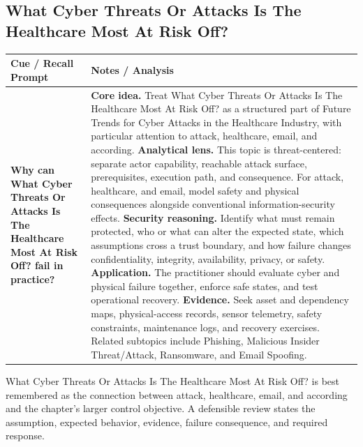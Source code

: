 \documentclass[11pt]{article}
\newcommand{\CornellHeader}{%
\rowcolor{Navy}\color{white}\bfseries Cue / Recall Prompt & \color{white}\bfseries Notes / Analysis\\\hline}
\newcommand{\CornellRow}[2]{%
\cellcolor{CueGray}\RaggedRight\textbf{#1} & \RaggedRight #2\\\hline}
\begin{document}
\subsection*{What Cyber Threats Or Attacks Is The Healthcare Most At Risk Off?}
\begin{longtable}{>{\RaggedRight\arraybackslash}p{}|>{\RaggedRight\arraybackslash}p{}}
\CornellHeader
\CornellRow{Why can What Cyber Threats Or Attacks Is The Healthcare Most At Risk Off? fail in practice?}{\textbf{Core idea.} Treat What Cyber Threats Or Attacks Is The Healthcare Most At Risk Off? as a structured part of Future Trends for Cyber Attacks in the Healthcare Industry, with particular attention to attack, healthcare, email, and according. \textbf{Analytical lens.} This topic is threat-centered: separate actor capability, reachable attack surface, prerequisites, execution path, and consequence. For attack, healthcare, and email, model safety and physical consequences alongside conventional information-security effects. \textbf{Security reasoning.} Identify what must remain protected, who or what can alter the expected state, which assumptions cross a trust boundary, and how failure changes confidentiality, integrity, availability, privacy, or safety. \textbf{Application.} The practitioner should evaluate cyber and physical failure together, enforce safe states, and test operational recovery. \textbf{Evidence.} Seek asset and dependency maps, physical-access records, sensor telemetry, safety constraints, maintenance logs, and recovery exercises. Related subtopics include Phishing, Malicious Insider Threat/Attack, Ransomware, and Email Spoofing.}
\end{longtable}
\begin{topicsummary}
What Cyber Threats Or Attacks Is The Healthcare Most At Risk Off? is best remembered as the connection between attack, healthcare, email, and according and the chapter's larger control objective. A defensible review states the assumption, expected behavior, evidence, failure consequence, and required response.
\end{topicsummary}
\end{document}
